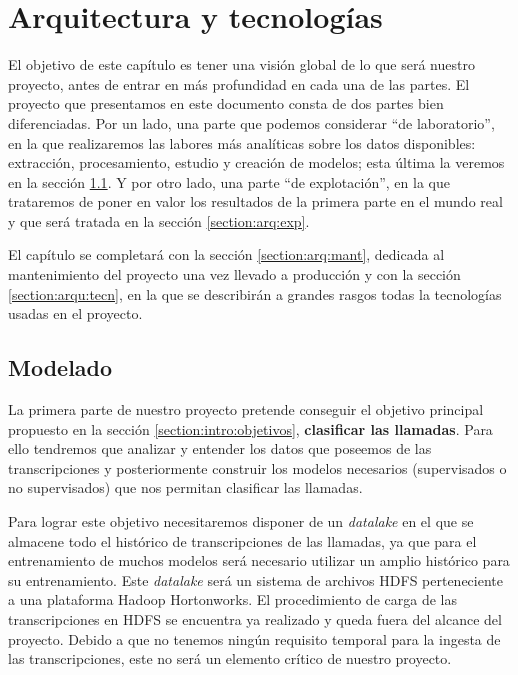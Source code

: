 \chapter{Arquitectura y tecnologías}
\label{chapter:arquitectura}

El objetivo de este capítulo es tener una visión global de lo que será nuestro proyecto, antes de entrar en más profundidad en cada una de las partes. El proyecto que presentamos en este documento consta de dos partes bien diferenciadas. Por un lado, una parte que podemos considerar ``de laboratorio'', en la que realizaremos las labores más analíticas sobre los datos disponibles: extracción, procesamiento, estudio y creación de modelos; esta última la veremos en la sección \ref{section:arq:mod}. Y por otro lado, una parte ``de explotación'', en la que trataremos de poner en valor los resultados de la primera parte en el mundo real y que será tratada en la sección \ref{section:arq:exp}. 


El capítulo se completará con la sección \ref{section:arq:mant}, dedicada al mantenimiento del proyecto una vez llevado a producción y con la sección \ref{section:arqu:tecn}, en la que se describirán a grandes rasgos todas la tecnologías usadas en el proyecto.





\section{Modelado}
\label{section:arq:mod}
La primera parte de nuestro proyecto pretende conseguir el objetivo principal propuesto en  la sección \ref{section:intro:objetivos}, \textbf{clasificar las llamadas}. Para ello tendremos que analizar y entender los datos que poseemos de las transcripciones y posteriormente construir los modelos necesarios (supervisados o no supervisados) que nos permitan clasificar las llamadas.

Para lograr este objetivo necesitaremos disponer de un \textit{datalake} en el que se almacene todo el histórico de transcripciones de las llamadas, ya que para el entrenamiento de muchos modelos será necesario utilizar un amplio histórico para su entrenamiento. Este \textit{datalake} será un sistema de archivos HDFS perteneciente a una plataforma Hadoop Hortonworks. El procedimiento de carga de las transcripciones en HDFS se encuentra ya realizado y queda fuera del alcance del proyecto. Debido a que no tenemos ningún requisito temporal para la ingesta de las transcripciones, este no será un elemento crítico de nuestro proyecto. 

